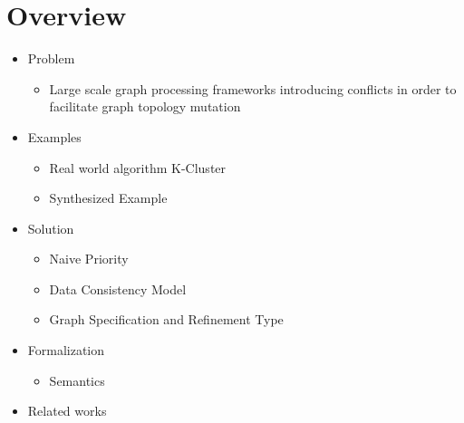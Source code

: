 \section{Overview}
\begin{frame}
\begin{itemize}
  \item Problem
  \begin{itemize}
    \item Large scale graph processing frameworks introducing conflicts in order to facilitate graph topology mutation
    \end{itemize}
  \item Examples
  \begin{itemize}
    \item Real world algorithm K-Cluster
    \item Synthesized Example
  \end{itemize}

  \item Solution
  \begin{itemize}
    \item Naive Priority 
    \item Data Consistency Model
    \item Graph Specification and Refinement Type
  \end{itemize}
  
  \item Formalization
	  \begin{itemize}
	    \item Semantics
	  \end{itemize}
  \item Related works
\end{itemize}

\end{frame} 
